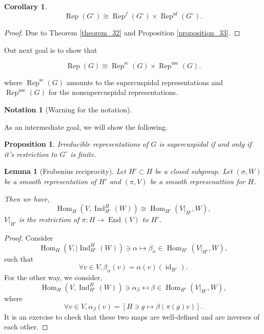 \documentclass[8pt]{article}
\newtheorem{proposition}{Proposition}[section]
\newtheorem{lemma}{Lemma}[section]
\newtheorem{notation}{Notation}[section]
\newtheorem{corollary}{Corollary} [section]
\DeclareMathOperator{\Ind}{Ind}
\DeclareMathOperator{\Rep}{Rep}
\DeclareMathOperator{\Hom}{Hom}
\DeclareMathOperator{\End}{End}
\DeclareMathOperator{\id}{id}
\DeclareMathOperator{\supcus}{sc}
\DeclareMathOperator{\nsc}{nsc}
\DeclareMathOperator{\nf}{nf}
\begin{document}
\begin{corollary}
  \label{corollary_40}
  \begin{equation*}
    \Rep(G^\circ)\cong\Rep^f(G^\circ)\times\Rep^{\nf}(G^\circ).
  \end{equation*}
\end{corollary}

\begin{proof}
  Due to Theorem \ref{theorem_32} and Proposition \ref{proposition_33}.
\end{proof}


Out next goal is to show that 

\begin{equation*}
  \Rep(G) \cong \Rep^{\supcus}(G)\times \Rep^{\nsc}(G).
\end{equation*}

where $\Rep^{\supcus}(G)$ amounts to the supercuspidal representations and $\Rep^{\nsc}(G)$ for the nonsupercuspidal representations.

\begin{notation}[Warning for the notation]
\end{notation}

As an intermediate goal, we will show the following.
\begin{proposition}
  Irreducible representations of $G$ is supercuspidal if and only if it's restriction to $G^\circ$ is finite.
\end{proposition} 

\begin{lemma}[Frobenius reciprocity]
  \label{lemma_41}
  \label{lemma_regular_frobenius}
  Let $H'\subset H$ be a closed subgroup. Let $(\sigma,W)$ be a smooth representation of $H'$ and $(\pi,V)$ be a smooth represenattion for $H$. \\
  \par Then we have,
  \begin{equation*}
  \Hom_H(V,\Ind_{H'}^H(W)) \cong \Hom_{H'}(V|_{H'},W),
  \end{equation*} 
  $V|_{H'}$ is the restriction of $\pi:H\to\End(V)$ to $H'$.
\end{lemma}

\begin{proof}
  Consider
  \begin{equation*}
  \Hom_H(V,|\Ind_{H'}^H(W))\ni\alpha\mapsto\beta_\alpha\in\Hom_{H'}(V|_{H'},W),
  \end{equation*}
  such that 
  \begin{equation*}
  \forall v\in V, \beta_\alpha(v) = \alpha(v)(\id_{H'}).
  \end{equation*}
  For the other way, we consider,
  \begin{equation*}
  \Hom_H(V,\Ind_{H'}^H(W))\ni\alpha_\beta\mapsfrom\beta\in\Hom_{H'}(V|_{H'},W),
  \end{equation*}
  where 
  \begin{equation*}
    \forall v\in V, \alpha_\beta(v) = [H\ni g\mapsto \beta(\pi(g)v)].
  \end{equation*}
  It is an exercise to check that these two maps are well-defined and are inverses of each other.
\end{proof}
\end{document}
